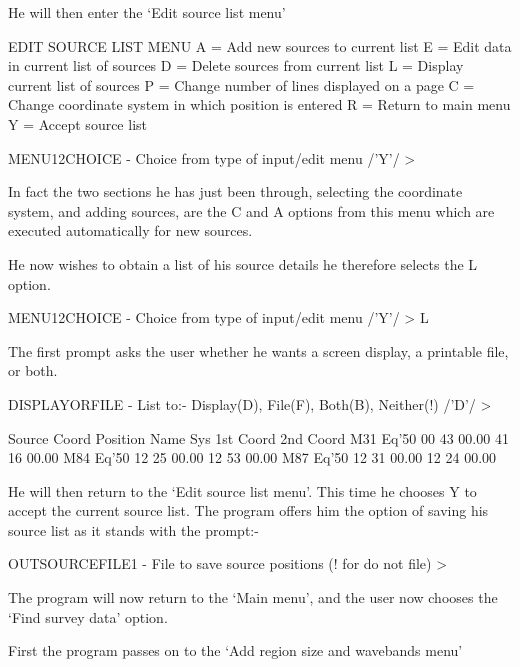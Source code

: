 \documentclass[twoside,11pt]{starlink}
\begin{document}
He will then enter the `Edit source list menu'

\begin{terminalv}
EDIT SOURCE LIST MENU
  A = Add new sources to current list
  E = Edit data in current list of sources
  D = Delete sources from current list
  L = Display current list of sources
  P = Change number of lines displayed on a page
  C = Change coordinate system in which position is entered
  R = Return to main menu
  Y = Accept source list

MENU12CHOICE - Choice from type of input/edit menu /'Y'/ >
\end{terminalv}

In fact the two sections he has just been through, selecting the coordinate
system, and adding sources, are the C and A options from this menu which are
executed automatically for new sources.

He now wishes to obtain a list of his source details he therefore selects
the L option.

\begin{terminalv}
MENU12CHOICE - Choice from type of input/edit menu /'Y'/ > L
\end{terminalv}

The first prompt asks the user whether he wants a screen display, a printable
file, or both.

\begin{terminalv}
DISPLAYORFILE - List to:- Display(D), File(F), Both(B), Neither(!) /'D'/ >

 Source    Coord             Position
  Name      Sys      1st Coord       2nd Coord
M31        Eq'50    00 43 00.00     41 16 00.00
M84        Eq'50    12 25 00.00     12 53 00.00
M87        Eq'50    12 31 00.00     12 24 00.00
\end{terminalv}

He will then return to the `Edit source list menu'. This time he chooses
Y to accept the current source list. The program offers him the option
of saving his source list as it stands with the prompt:-

\begin{terminalv}
OUTSOURCEFILE1 - File to save source positions (! for do not file) >
\end{terminalv}

The program will now return to the `Main menu', and the user now chooses
the `Find survey data' option.

First the program passes on to the `Add region size and wavebands menu'
\end{document}
